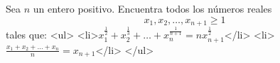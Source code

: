 Sea $n$ un entero positivo. Encuentra todos los números reales 
\[x_1,x_2,\dots,x_{n+1}\geq1\]
tales que:
<ul>
<li>$x_1^{\frac{1}{2}}+x_2^{\frac{1}{3}}+\dots+x_n^{\frac{1}{n+1}}=nx_{n+1}^\frac{1}{2}$</li>
<li>$\frac{x_1+x_2+\dots+x_n}{n}=x_{n+1}$</li>
</ul>